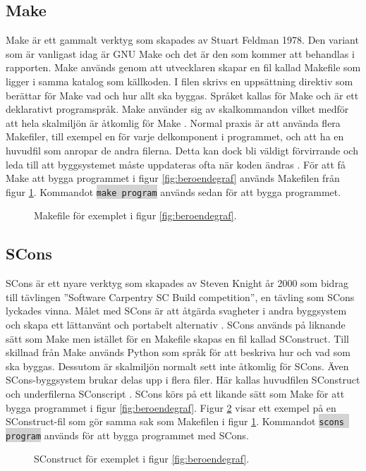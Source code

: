 \subsection{Make}
Make är ett gammalt verktyg som skapades av Stuart Feldman 1978. Den variant som är vanligast idag är GNU Make och det är den som kommer att behandlas i rapporten. Make används genom att utvecklaren skapar en fil kallad Makefile som ligger i samma katalog som källkoden. I filen skrivs en uppsättning direktiv som berättar för Make vad och hur allt ska byggas. Språket kallas för Make och är ett deklarativt programspråk. Make använder sig av skalkommandon vilket medför att hela skalmiljön är åtkomlig för Make \citep{make}.
\newline
\newline
Normal praxis är att använda flera Makefiler, till exempel en för varje delkomponent i programmet, och att ha en huvudfil som anropar de andra filerna. Detta kan dock bli väldigt förvirrande och leda till att byggsystemet måste uppdateras ofta när koden ändras \citep{recursivemake}.
\newline
\newline
För att få Make att bygga programmet i figur \ref{fig:beroendegraf} används Makefilen från figur \ref{fig:makefile}. Kommandot \colorbox{lightgray}{\lstinline$make program$} används sedan för att bygga programmet.

\begin{figure}[h!]
  
  \caption{Makefile för exemplet i figur \ref{fig:beroendegraf}.}
  \label{fig:makefile}
\end{figure}

\subsection{SCons}
SCons är ett nyare verktyg som skapades av Steven Knight år 2000 som bidrag till tävlingen ''Software Carpentry SC Build competition'', en tävling som SCons lyckades vinna. Målet med SCons är att åtgärda svagheter i andra byggsystem och skapa ett lättanvänt och portabelt alternativ \citep{scons}. SCons används på liknande sätt som Make men istället för en Makefile skapas en fil kallad SConstruct. Till skillnad från Make används Python som språk för att beskriva hur och vad som ska byggas. Dessutom är skalmiljön normalt sett inte åtkomlig för SCons. Även SCons-byggsystem brukar delas upp i flera filer. Här kallas huvudfilen SConstruct och underfilerna SConscript \citep{sconsmanual}.
\newline
\newline
SCons körs på ett likande sätt som Make för att bygga programmet i figur \ref{fig:beroendegraf}. Figur \ref{fig:sconstruct} visar ett exempel på en SConstruct-fil som gör samma sak som Makefilen i figur \ref{fig:makefile}. Kommandot \colorbox{lightgray}{\lstinline$scons program$} används för att bygga programmet med SCons.

\begin{figure}[h!]
  
  \caption{SConstruct för exemplet i figur \ref{fig:beroendegraf}.}
  \label{fig:sconstruct}
\end{figure}
